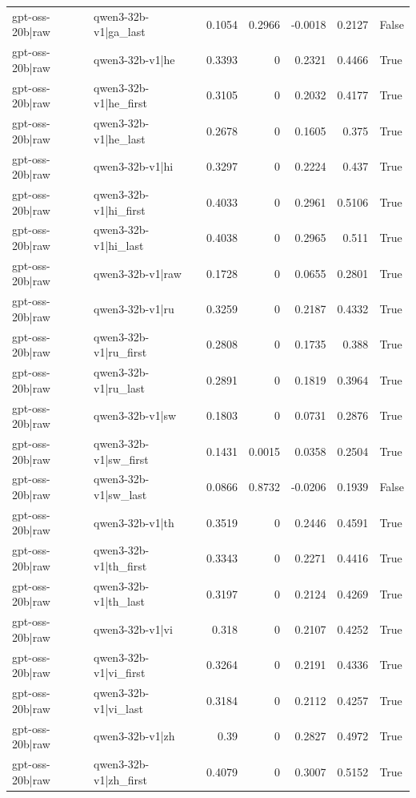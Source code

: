 \begin{table}
\begin{tabular}{l l r r r r l}
gpt-oss-20b|raw & qwen3-32b-v1|ga_last & 0.1054 & 0.2966 & -0.0018 & 0.2127 & False \\
gpt-oss-20b|raw & qwen3-32b-v1|he & 0.3393 & 0 & 0.2321 & 0.4466 & True \\
gpt-oss-20b|raw & qwen3-32b-v1|he_first & 0.3105 & 0 & 0.2032 & 0.4177 & True \\
gpt-oss-20b|raw & qwen3-32b-v1|he_last & 0.2678 & 0 & 0.1605 & 0.375 & True \\
gpt-oss-20b|raw & qwen3-32b-v1|hi & 0.3297 & 0 & 0.2224 & 0.437 & True \\
gpt-oss-20b|raw & qwen3-32b-v1|hi_first & 0.4033 & 0 & 0.2961 & 0.5106 & True \\
gpt-oss-20b|raw & qwen3-32b-v1|hi_last & 0.4038 & 0 & 0.2965 & 0.511 & True \\
gpt-oss-20b|raw & qwen3-32b-v1|raw & 0.1728 & 0 & 0.0655 & 0.2801 & True \\
gpt-oss-20b|raw & qwen3-32b-v1|ru & 0.3259 & 0 & 0.2187 & 0.4332 & True \\
gpt-oss-20b|raw & qwen3-32b-v1|ru_first & 0.2808 & 0 & 0.1735 & 0.388 & True \\
gpt-oss-20b|raw & qwen3-32b-v1|ru_last & 0.2891 & 0 & 0.1819 & 0.3964 & True \\
gpt-oss-20b|raw & qwen3-32b-v1|sw & 0.1803 & 0 & 0.0731 & 0.2876 & True \\
gpt-oss-20b|raw & qwen3-32b-v1|sw_first & 0.1431 & 0.0015 & 0.0358 & 0.2504 & True \\
gpt-oss-20b|raw & qwen3-32b-v1|sw_last & 0.0866 & 0.8732 & -0.0206 & 0.1939 & False \\
gpt-oss-20b|raw & qwen3-32b-v1|th & 0.3519 & 0 & 0.2446 & 0.4591 & True \\
gpt-oss-20b|raw & qwen3-32b-v1|th_first & 0.3343 & 0 & 0.2271 & 0.4416 & True \\
gpt-oss-20b|raw & qwen3-32b-v1|th_last & 0.3197 & 0 & 0.2124 & 0.4269 & True \\
gpt-oss-20b|raw & qwen3-32b-v1|vi & 0.318 & 0 & 0.2107 & 0.4252 & True \\
gpt-oss-20b|raw & qwen3-32b-v1|vi_first & 0.3264 & 0 & 0.2191 & 0.4336 & True \\
gpt-oss-20b|raw & qwen3-32b-v1|vi_last & 0.3184 & 0 & 0.2112 & 0.4257 & True \\
gpt-oss-20b|raw & qwen3-32b-v1|zh & 0.39 & 0 & 0.2827 & 0.4972 & True \\
gpt-oss-20b|raw & qwen3-32b-v1|zh_first & 0.4079 & 0 & 0.3007 & 0.5152 & True \\

\end{tabular}
\end{table}
